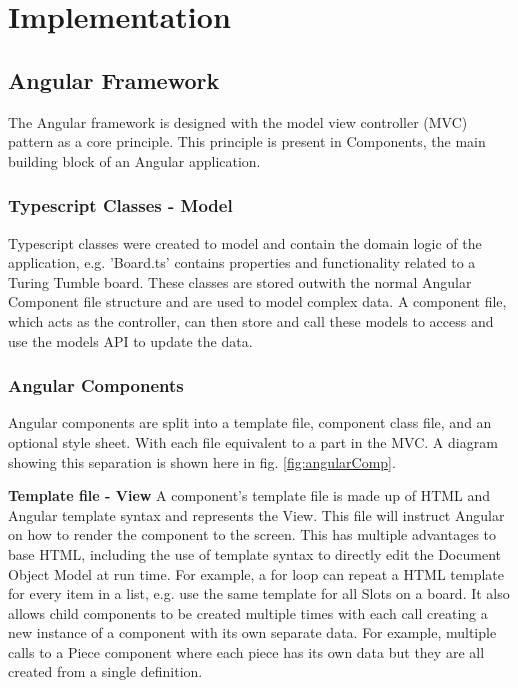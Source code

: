 \documentclass{l4proj}
\begin{document}
\chapter{Implementation}
\label{section:implementation}
\section{Angular Framework}
The Angular framework is designed with the model view controller (MVC) pattern as a core principle.  This principle is present in Components, the main building block of an Angular application. 

\subsection{Typescript Classes - Model}
Typescript classes were created to model and contain the domain logic of the application, e.g. 'Board.ts' contains properties and functionality related to a Turing Tumble board. These classes are stored outwith the normal Angular Component file structure and are used to model complex data. A component file, which acts as the controller, can then store and call these models to access and use the models API to update the data.

\subsection{Angular Components}
Angular components are split into a template file, component class file, and an optional style sheet. With each file equivalent to a part in the MVC. A diagram showing this separation is shown here in fig. \ref{fig:angularComp}. 

\textbf{Template file - View}
A component's template file is made up of HTML and Angular template syntax and represents the View. This file will instruct Angular on how to render the component to the screen. This has multiple advantages to base HTML, including the use of template syntax to directly edit the Document Object Model at run time. For example, a for loop can repeat a HTML template for every item in a list, e.g. use the same template for all Slots on a board. It also allows child components to be created multiple times with each call creating a new instance of a component with its own separate data. For example, multiple calls to a Piece component where each piece has its own data but they are all created from a single definition.
\end{document}
